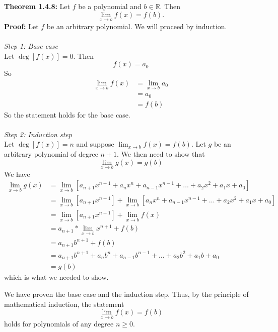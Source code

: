 \documentclass{article}
\begin{document}
	\textbf{Theorem 1.4.8:} Let $f$ be a polynomial and $b \in \mathbb{R}$. Then
	$$\lim_{x \to b}{f(x)} = f(b).$$
	\textbf{Proof:}
	Let $f$ be an arbitrary polynomial. We will proceed by induction. \\\\
	\textit{Step 1: Base case} \\
	Let $\deg{[f(x)]} = 0$. Then
	$$f(x) = a_0$$
	So
	\begin{align*}
		\lim_{x \to b}{f(x)} &= \lim_{x \to b}{a_0} \\
		                     &= a_0 \tag{Theorem 1.3.3} \\
		                     &= f(b)
	\end{align*}
	So the statement holds for the base case. \\\\
	\textit{Step 2: Induction step} \\
	Let $\deg{[f(x)] = n}$ and suppose $\lim_{x \to b}{f(x)} = f(b)$. Let $g$ be an arbitrary polynomial of degree $n + 1$. We then need to show that
	$$\lim_{x \to b}{g(x)} = g(b)$$
	We have
	\begin{align*}
		\lim_{x \to b}{g(x)} &= \lim_{x \to b}{\left[a_{n+1}x^{n+1} + a_nx^n + a_{n-1}x^{n-1} + \ldots + a_2x^2 + a_1x + a_0\right]} \\
		                     &= \lim_{x \to b}{\left[a_{n+1}x^{n+1}\right] + \lim_{x \to b}\left[a_nx^n + a_{n-1}x^{n-1} + \ldots + a_2x^2 + a_1x + a_0\right]} \tag{Theorem 1.4.1} \\
		                     &=  \lim_{x \to b}{\left[a_{n+1}x^{n+1}\right]} + \lim_{x \to b}{f(x)}\\
		                     &= a_{n+1} * \lim_{x \to b}{x^{n+1}} + f(b) \tag{Theorem 1.4.3}\\
		                     &= a_{n+1}b^{n+1} + f(b) \tag{Theorem 1.4.7}\\
		                     &= a_{n+1}b^{n+1} + a_nb^n + a_{n-1}b^{n-1} + \ldots + a_2b^2 + a_1b + a_0 \\
		                     &= g(b)
	\end{align*}
	which is what we needed to show.
	
	We have proven the base case and the induction step. Thus, by the principle of mathematical induction, the statement
	$$\lim_{x \to b}{f(x)} = f(b)$$
	holds for polynomials of any degree $n \geq 0$.
	 
\end{document}

